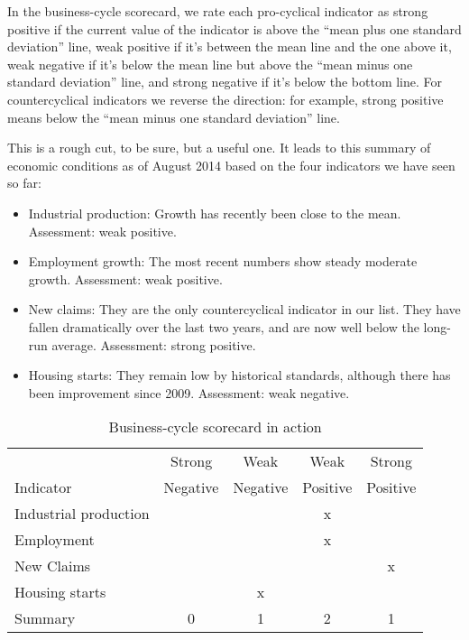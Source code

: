 In the business-cycle scorecard,
we rate each pro-cyclical indicator 
 as strong positive if
the current value of the indicator is above the
``mean plus one standard deviation'' line,
weak positive if it's between the mean line and the one above it,
weak negative if it's below the mean line but above
the ``mean minus one standard deviation'' line,
and strong negative if it's below the bottom line.
For   countercyclical   
 indicators we reverse the direction:
for example, strong positive means below the ``mean minus one standard deviation'' line.

This is a rough cut, to be sure, but a useful one.
It leads to this summary of economic conditions as of August 2014
based on the four indicators we have seen so far:
\begin{itemize}
    \item Industrial production: Growth has recently been close to the mean. Assessment:  weak positive.

    \item Employment growth:  The most recent numbers show steady moderate growth. Assessment:  weak positive.

    \item New claims:  They are the only countercyclical indicator in our list. They have fallen dramatically over the last two years, and are now well below the long-run average.
        Assessment: strong positive.

    \item Housing starts:  They remain low by historical standards, although there has been improvement since 2009. Assessment: weak negative.
\end{itemize}


\begin{table}[!ht]
\centering
\caption{Business-cycle scorecard in action} %
\begin{tabular}{lcccc}
\toprule
                       &  Strong    &  Weak    &  Weak    &  Strong  \\
Indicator              &  Negative  & Negative & Positive & Positive \\
\midrule
Industrial production  &            &          & x        &\\
Employment             &            &          & x        &\\
New Claims             &            &          &          &x \\
Housing starts         &            & x        &          &\\
\midrule
Summary                & 0          & 1        & 2        & 1 \\
\bottomrule
\end{tabular}
\label{tab:scorecard}
\end{table}

